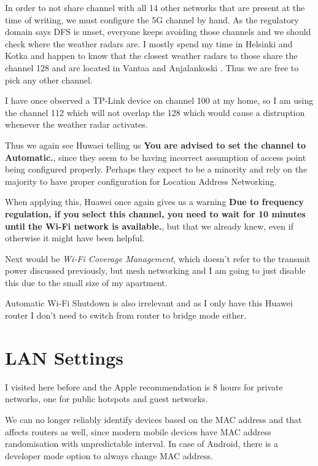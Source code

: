 \documentclass[../wifi-security.tex]{subfiles}
\begin{document}
In order to not share channel with all 14 other networks that are present at the time of writing, we must configure the 5G channel by hand. As the regulatory domain says DFS is unset, everyone keeps avoiding those channels and we should check where the weather radars are. I mostly spend my time in Helsinki and Kotka and happen to know that the closest weather radars to those share the channel 128 and are located in Vantaa and Anjalankoski \autocite{metisweather}. Thus we are free to pick any other channel.

I have once observed a TP-Link device on channel 100 at my home, so I am using the channel 112 which will not overlap the 128 which would cause a distruption whenever the weather radar activates.

Thus we again see Huwaei telling us \textbf{You are advised to set the channel to Automatic.}, since they seem to be having incorrect assumption of access point being configured properly. Perhaps they expect to be a minority and rely on the majority to have proper configuration for Location Address Networking.

When applying this, Huawei once again gives us a warning \textbf{Due to frequency regulation, if you select this channel, you need to wait for 10 minutes until the Wi-Fi network is available.}, but that we already knew, even if otherwise it might have been helpful.

Next would be \textit{Wi-Fi Coverage Management}, which doesn't refer to the transmit power discussed previously, but mesh networking and I am going to just disable this due to the small size of my apartment.

Automatic Wi-Fi Shutdown is also irrelevant and as I only have this Huawei router I don't need to switch from router to bridge mode either.

\section{LAN Settings}

I visited here before and the Apple recommendation is 8 hours for private networks, one for public hotspots and guest networks.\autocite{appleap}

We can no longer reliably identify devices based on the MAC address and that affects routers as well, since modern mobile devices have MAC address randomisation with unpredictable interval. In case of Android, there is a developer mode option to always change MAC address.
\end{document}
